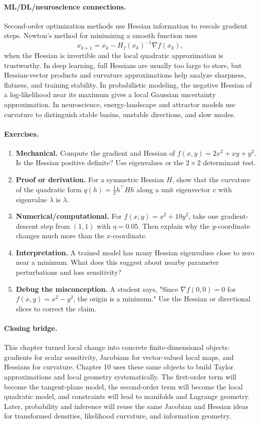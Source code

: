 \paragraph{ML/DL/neuroscience connections.}
Second-order optimization methods use Hessian information to rescale gradient steps. Newton's method for minimizing a smooth function uses
\[
x_{k+1}=x_k-H_f(x_k)^{-1}\nabla f(x_k),
\]
when the Hessian is invertible and the local quadratic approximation is trustworthy. In deep learning, full Hessians are usually too large to store, but Hessian-vector products and curvature approximations help analyze sharpness, flatness, and training stability. In probabilistic modeling, the negative Hessian of a log-likelihood near its maximum gives a local Gaussian uncertainty approximation. In neuroscience, energy-landscape and attractor models use curvature to distinguish stable basins, unstable directions, and slow modes.

\paragraph{Exercises.}
\begin{enumerate}[label=\textbf{9.4.\arabic*.}, leftmargin=*]
\item \textbf{Mechanical.} Compute the gradient and Hessian of \(f(x,y)=2x^2+xy+y^2\). Is the Hessian positive definite? Use eigenvalues or the \(2\times2\) determinant test.
\item \textbf{Proof or derivation.} For a symmetric Hessian \(H\), show that the curvature of the quadratic form \(q(h)=\frac{1}{2}h^\top Hh\) along a unit eigenvector \(v\) with eigenvalue \(\lambda\) is \(\lambda\).
\item \textbf{Numerical/computational.} For \(f(x,y)=x^2+10y^2\), take one gradient-descent step from \((1,1)\) with \(\eta=0.05\). Then explain why the \(y\)-coordinate changes much more than the \(x\)-coordinate.
\item \textbf{Interpretation.} A trained model has many Hessian eigenvalues close to zero near a minimum. What does this suggest about nearby parameter perturbations and loss sensitivity?
\item \textbf{Debug the misconception.} A student says, "Since \(\nabla f(0,0)=0\) for \(f(x,y)=x^2-y^2\), the origin is a minimum." Use the Hessian or directional slices to correct the claim.
\end{enumerate}

\paragraph{Closing bridge.}
This chapter turned local change into concrete finite-dimensional objects: gradients for scalar sensitivity, Jacobians for vector-valued local maps, and Hessians for curvature. Chapter 10 uses these same objects to build Taylor approximations and local geometry systematically. The first-order term will become the tangent-plane model, the second-order term will become the local quadratic model, and constraints will lead to manifolds and Lagrange geometry. Later, probability and inference will reuse the same Jacobian and Hessian ideas for transformed densities, likelihood curvature, and information geometry.

\clearpage
